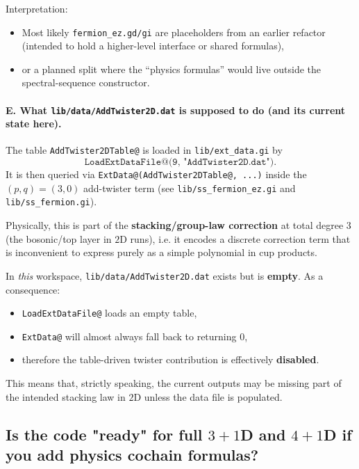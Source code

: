 \documentclass{SciPost}
\begin{document}
Interpretation:
\begin{itemize}
    \item Most likely \texttt{fermion\_ez.gd/gi} are placeholders from an earlier refactor (intended to hold a higher-level interface or shared formulas),
    \item or a planned split where the ``physics formulas'' would live outside the spectral-sequence constructor.
\end{itemize}

\paragraph{E. What \texttt{lib/data/AddTwister2D.dat} is supposed to do (and its current state here).}

The table \texttt{AddTwister2DTable@} is loaded in \texttt{lib/ext\_data.gi} by
\begin{equation}
	\texttt{LoadExtDataFile@(9, "AddTwister2D.dat")}.
\end{equation}
It is then queried via \texttt{ExtData@(AddTwister2DTable@, ...)} inside the $(p,q)=(3,0)$ add-twister term (see \texttt{lib/ss\_fermion\_ez.gi} and \texttt{lib/ss\_fermion.gi}).

Physically, this is part of the \textbf{stacking/group-law correction} at total degree $3$ (the bosonic/top layer in $2$D runs), i.e. it encodes a discrete correction term that is inconvenient to express purely as a simple polynomial in cup products.

In \emph{this} workspace, \texttt{lib/data/AddTwister2D.dat} exists but is \textbf{empty}.
As a consequence:
\begin{itemize}
    \item \texttt{LoadExtDataFile@} loads an empty table,
    \item \texttt{ExtData@} will almost always fall back to returning $0$,
    \item therefore the table-driven twister contribution is effectively \textbf{disabled}.
\end{itemize}
This means that, strictly speaking, the current outputs may be missing part of the intended stacking law in $2$D unless the data file is populated.

\subsection{Is the code "ready" for full $3{+}1$D and $4{+}1$D if you add physics cochain formulas?}
\end{document}
